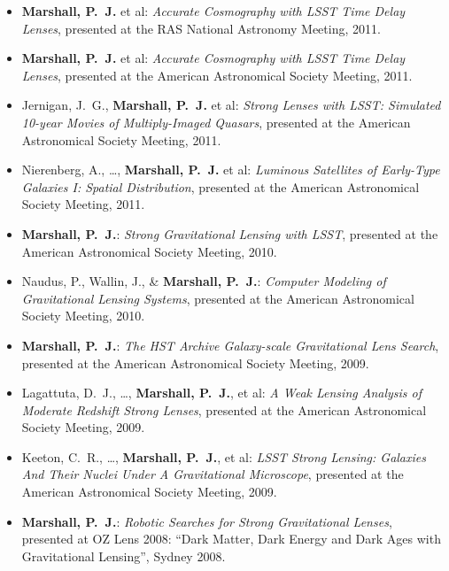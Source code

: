 \begin{itemize}
\item{\textbf{Marshall, P.~J.} et al:
\textit{Accurate Cosmography with LSST Time Delay Lenses},
presented at the {RAS National Astronomy Meeting}, 2011.
}

\item{\textbf{Marshall, P.~J.} et al:
\textit{Accurate Cosmography with LSST Time Delay Lenses},
presented at the {American Astronomical Society Meeting}, 2011.
}

\item{Jernigan, J.~G., \textbf{Marshall, P.~J.} et al:
\textit{Strong Lenses with LSST: Simulated 10-year Movies of Multiply-Imaged
Quasars}, presented at the {American Astronomical Society Meeting}, 2011.
}

\item{Nierenberg, A., \ldots, \textbf{Marshall, P.~J.} et al:
\textit{Luminous Satellites of Early-Type Galaxies I: Spatial Distribution},
presented at the {American Astronomical Society Meeting}, 2011.
}

\item{\textbf{Marshall, P.~J.}:
\textit{Strong Gravitational Lensing with LSST},
presented at the {American Astronomical Society Meeting}, 2010.
}

\item{Naudus, P., Wallin, J., \& \textbf{Marshall, P.~J.}:
\textit{Computer Modeling of Gravitational Lensing Systems},
presented at the {American Astronomical Society Meeting}, 2010.
}

\item{\textbf{Marshall, P.~J.}:
\textit{The HST Archive Galaxy-scale Gravitational Lens Search},
presented at the {American Astronomical Society Meeting}, 2009.
}

\item{{Lagattuta}, D.~J., \dots, \textbf{Marshall, P.~J.}, et al:
\textit{A Weak Lensing Analysis of Moderate Redshift Strong Lenses},
presented at the {American Astronomical Society Meeting}, 2009.
}

\item{{Keeton}, C.~R., \ldots, \textbf{Marshall, P.~J.}, et al:
\textit{LSST Strong Lensing: Galaxies And Their Nuclei Under A Gravitational Microscope},
presented at the {American Astronomical Society Meeting}, 2009.
}

\item{\textbf{Marshall, P.~J.}:
\textit{Robotic Searches for Strong Gravitational Lenses},
presented at OZ Lens 2008:
``Dark Matter, Dark Energy and Dark Ages with Gravitational Lensing'', Sydney
2008.
}


\end{itemize}
